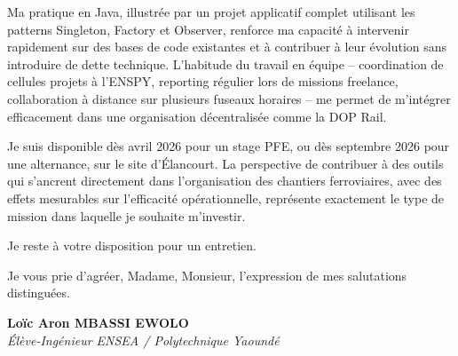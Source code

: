 \documentclass[a4paper,11pt]{article}
\begin{document}
Ma pratique en Java, illustrée par un projet applicatif complet utilisant les patterns Singleton, Factory et Observer, renforce ma capacité à intervenir rapidement sur des bases de code existantes et à contribuer à leur évolution sans introduire de dette technique. L'habitude du travail en équipe -- coordination de cellules projets à l'ENSPY, reporting régulier lors de missions freelance, collaboration à distance sur plusieurs fuseaux horaires -- me permet de m'intégrer efficacement dans une organisation décentralisée comme la DOP Rail.

Je suis disponible dès avril 2026 pour un stage PFE, ou dès septembre 2026 pour une alternance, sur le site d'Élancourt. La perspective de contribuer à des outils qui s'ancrent directement dans l'organisation des chantiers ferroviaires, avec des effets mesurables sur l'efficacité opérationnelle, représente exactement le type de mission dans laquelle je souhaite m'investir.

Je reste à votre disposition pour un entretien.

Je vous prie d'agréer, Madame, Monsieur, l'expression de mes salutations distinguées.

\vspace{0.8cm}

\textbf{Loïc Aron MBASSI EWOLO}\\
\textit{Élève-Ingénieur ENSEA / Polytechnique Yaoundé}
\end{document}
